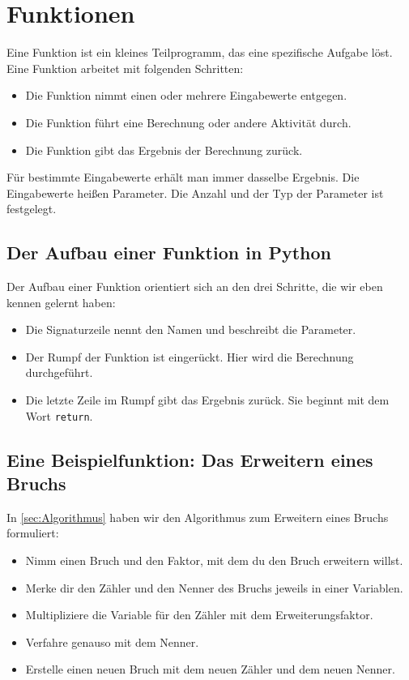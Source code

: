 \section{Funktionen}

Eine Funktion ist ein kleines Teilprogramm, das eine spezifische Aufgabe löst. Eine Funktion arbeitet mit folgenden Schritten:
\begin{itemize}
	\item Die Funktion nimmt einen oder mehrere Eingabewerte entgegen.
	\item Die Funktion führt eine Berechnung oder andere Aktivität durch.
	\item Die Funktion gibt das Ergebnis der Berechnung zurück.
\end{itemize}

Für bestimmte Eingabewerte erhält man immer dasselbe Ergebnis. Die Eingabewerte heißen Parameter. Die Anzahl und der Typ der Parameter ist festgelegt.

\subsection*{Der Aufbau einer Funktion in Python}

Der Aufbau einer Funktion orientiert sich an den drei Schritte, die wir eben kennen gelernt haben:
\begin{itemize}
	\item Die Signaturzeile nennt den Namen und beschreibt die Parameter.
	\item Der Rumpf der Funktion ist eingerückt. Hier wird die Berechnung durchgeführt.
	\item Die letzte Zeile im Rumpf gibt das Ergebnis zurück. Sie beginnt mit dem Wort \texttt{return}.
\end{itemize}

\subsection*{Eine Beispielfunktion: Das Erweitern eines Bruchs}
\label{sec:FunktionErweitern}

In \ref{sec:Algorithmus} haben wir den Algorithmus zum Erweitern eines Bruchs formuliert:
\begin{itemize}
	\item Nimm einen Bruch und den Faktor, mit dem du den Bruch erweitern willst.
	\item Merke dir den Zähler und den Nenner des Bruchs jeweils in einer Variablen.
	\item Multipliziere die Variable für den Zähler mit dem Erweiterungsfaktor.
	\item Verfahre genauso mit dem Nenner.
	\item Erstelle einen neuen Bruch mit dem neuen Zähler und dem neuen Nenner.
\end{itemize}

